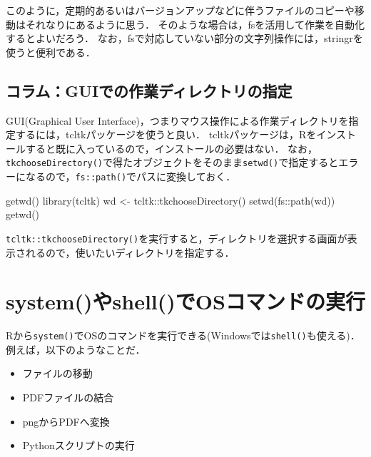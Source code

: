 \documentclass[
]{article}
\newenvironment{Shaded}{\begin{snugshade}}{\end{snugshade}}
\newcommand{\FunctionTok}[1]{\textcolor[rgb]{0.00,0.00,0.00}{#1}}
\newcommand{\NormalTok}[1]{#1}
\newcommand{\OtherTok}[1]{\textcolor[rgb]{0.56,0.35,0.01}{#1}}
\newcommand{\SpecialCharTok}[1]{\textcolor[rgb]{0.00,0.00,0.00}{#1}}
\providecommand{\tightlist}{%
  \setlength{\itemsep}{0pt}\setlength{\parskip}{0pt}}
\begin{document}
このように，定期的あるいはバージョンアップなどに伴うファイルのコピーや移動はそれなりにあるように思う．
そのような場合は，fsを活用して作業を自動化するとよいだろう．
なお，fsで対応していない部分の文字列操作には，stringrを使うと便利である．

\hypertarget{ux30b3ux30e9ux30e0guiux3067ux306eux4f5cux696dux30c7ux30a3ux30ecux30afux30c8ux30eaux306eux6307ux5b9a}{%
\subsection{コラム：GUIでの作業ディレクトリの指定}\label{ux30b3ux30e9ux30e0guiux3067ux306eux4f5cux696dux30c7ux30a3ux30ecux30afux30c8ux30eaux306eux6307ux5b9a}}

GUI(Graphical User Interface)，つまりマウス操作による作業ディレクトリを指定するには，tcltkパッケージを使うと良い．
tcltkパッケージは，Rをインストールすると既に入っているので，インストールの必要はない．
なお，\texttt{tkchooseDirectory()}で得たオブジェクトをそのまま\texttt{setwd()}で指定するとエラーになるので，\texttt{fs::path()}でパスに変換しておく．

\begin{Shaded}
\begin{Highlighting}[]
\FunctionTok{getwd}\NormalTok{()}
\FunctionTok{library}\NormalTok{(tcltk)}
\NormalTok{wd }\OtherTok{\textless{}{-}}\NormalTok{ tcltk}\SpecialCharTok{::}\FunctionTok{tkchooseDirectory}\NormalTok{()}
\FunctionTok{setwd}\NormalTok{(fs}\SpecialCharTok{::}\FunctionTok{path}\NormalTok{(wd))}
\FunctionTok{getwd}\NormalTok{()}
\end{Highlighting}
\end{Shaded}

\texttt{tcltk::tkchooseDirectory()}を実行すると，ディレクトリを選択する画面が表示されるので，使いたいディレクトリを指定する．

\hypertarget{shell}{%
\section{system()やshell()でOSコマンドの実行}\label{shell}}

Rから\texttt{system()}でOSのコマンドを実行できる(Windowsでは\texttt{shell()}も使える)．
例えば，以下のようなことだ．

\begin{itemize}
\tightlist
\item
  ファイルの移動\\
\item
  PDFファイルの結合\\
\item
  pngからPDFへ変換\\
\item
  Pythonスクリプトの実行
\end{itemize}
\end{document}
